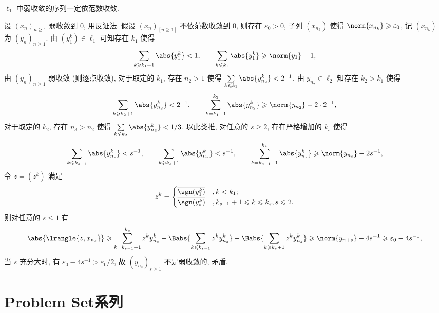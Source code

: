 	\begin{Proposition}
		$ \ell_{1} $ 中弱收敛的序列一定依范数收敛. 
	\end{Proposition}
	\begin{answer}
		设 $ (x_{n})_{n\geqslant1} $ 弱收敛到 0, 用反证法. 假设 $ (x_{n})_[n\geqslant1] $ 不依范数收敛到 0, 则存在 $ \varepsilon_{0}>0 $, 子列 $ (x_{n_{k}}) $ 使得 $ \norm{x_{n_{k}}}\geqslant\varepsilon_{0} $, 记 $ (x_{n_{k}}) $ 为 $ (y_{n})_{n\geqslant1} $. 由 $ (y_{1}^{k})\in\ell_{1} $ 可知存在 $ k_{1} $ 使得
		\[
			\sum_{k\geqslant k_{1}+1}\abs{y_{1}^{k}}<1, \qquad \sum_{k\leqslant k_{1}}\abs{y_{1}^{k}}\geqslant\norm{y_{1}}-1,
		\]
		由 $ (y_{n})_{n\geqslant1} $ 弱收敛 (则逐点收敛), 对于取定的 $ k_{1} $, 存在 $ n_{2}>1 $ 使得 $ \sum\limits_{k\leqslant k_{1}}\abs{y_{n_{2}}^{k}}<2^{=1} $. 由 $ y_{n_{2}}\in\ell_{2} $ 知存在 $ k_{2}>k_{1} $ 使得
		\[
			\sum_{k\geqslant k_{2}+1}\abs{y_{n_{2}}^{k}}<2^{-1}, \qquad \sum_{k = k_{1}+1}^{k_{2}}\abs{y_{n_{2}}^{k}}\geqslant \norm{y_{n_{2}}}-2\cdot2^{-1}, 
		\]
		对于取定的 $ k_{2} $, 存在 $ n_{3}>n_{2} $ 使得 $ \sum\limits_{k\leqslant k_{2}}\abs{y_{n_{3}}^{k}}<1/3 $. 以此类推, 对任意的 $ s\geqslant 2 $, 存在严格增加的 $ k_{s} $ 使得
		\[
			\sum_{k\leqslant k_{s-1}}\abs{y_{n_{s}}^{k}}< s^{-1},\qquad \sum_{k\geqslant k_{s}+1}\abs{y_{n_{s}}^{k}}< s^{-1}, \qquad \sum_{k = k_{s-1}+1}^{k_{s}} \abs{y_{n_{s}}^{k}}\geqslant \norm{y_{n_{s}}}-2s^{-1},
		\]
		令 $ z=(z^{k}) $ 满足
		\[
			z^{k}=\begin{cases}
				\overline{\sgn(y_{1}^{k})} & , k<k_{1};\\
				\overline{\sgn(y_{s}^{k})} & , k_{s-1}+1\leqslant k\leqslant k_{s}, s\leqslant 2.
			\end{cases}
		\]
		则对任意的 $ s\leqslant1 $ 有
		\[
			\abs{\lrangle{z, x_{n_{s}}}}\geqslant \sum_{k=k_{s-1}+1}^{k_{s}}z^{k}y_{n_{s}}^{k}-\Babs{\sum_{k\leqslant k_{s-1}}z^{k}y_{n_{s}}^{k}}-\Babs{\sum_{k\geqslant k_{s}+1}z^{k}y_{n_{s}}^{k}}\geqslant\norm{y_{n+{s}}}-4s^{-1}\geqslant\varepsilon_{0}-4s^{-1},
		\]
		当 $ s $ 充分大时, 有 $ \varepsilon_{0}-4s^{-1}>\varepsilon_{0}/2 $, 故 $ (y_{n_{s}})_{s\geqslant1} $ 不是弱收敛的, 矛盾.\qedhere
	\end{answer}

\section{Problem Set系列}

